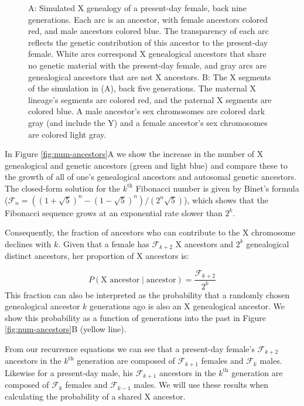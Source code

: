 \documentclass[9pt,twocolumn,twoside]{gsajnl}
\begin{document}
\begin{figure}[!ht]
    \caption{A: Simulated X genealogy of a present-day female, back nine
      generations.  Each arc is an ancestor, with female ancestors colored red,
      and male ancestors colored blue. The transparency of each arc reflects
      the genetic contribution of this ancestor to the present-day female.
      White arcs correspond X genealogical ancestors that share no genetic
      material with the present-day female, and gray arcs are genealogical
      ancestors that are not X ancestors. B: The X segments of the simulation
      in (A), back five generations.  The maternal X lineage's segments are
      colored red, and the paternal X segments are colored blue. A male
      ancestor's sex chromosomes are colored dark gray (and include the Y) and
    a female ancestor's sex chromosomes are colored light gray.}

    \label{fig:x-arc}

  \end{figure}

In Figure \ref{fig:num-ancestors}A we show the increase in the number of X
genealogical and genetic ancestors (green and light blue) and compare these to
the growth of all of one's genealogical ancestors and autosomal genetic
ancestors. The closed-form solution for the $k^\text{th}$ Fibonacci number is
given by Binet's formula ($\mathcal{F}_n = ((1 + \sqrt{5})^n - (1 -
\sqrt{5})^n)/(2^n \sqrt{5})$), which shows that the Fibonacci sequence grows at
an exponential rate slower than $2^k$. 

Consequently, the fraction of ancestors who can contribute to the X chromosome
declines with $k$. Given that a female has $\mathcal{F}_{k+2}$ X ancestors and
$2^k$ genealogical distinct ancestors, her proportion of X ancestors is:

\begin{equation}
  \label{eq:prob-x-anc}
  P(\text{X ancestor} \;|\; \text{ancestor}) = \frac{\mathcal{F}_{k+2}}{2^k} 
\end{equation}
%
This fraction can also be interpreted as the probability that a randomly chosen
genealogical ancestor $k$ generations ago is also an X genealogical ancestor.
We show this probability as a function of generations into the past in Figure
\ref{fig:num-ancestors}B (yellow line).

From our recurrence equations we can see that a present-day female's
$\mathcal{F}_{k+2}$ ancestors in the $k^\text{th}$ generation are composed of
$\mathcal{F}_{k+1}$ females and $\mathcal{F}_{k}$ males. Likewise for a
present-day male, his $\mathcal{F}_{k+1}$ ancestors in the $k^\text{th}$
generation are composed of $\mathcal{F}_{k}$ females and $\mathcal{F}_{k-1}$
males. We will use these results when calculating the probability of a shared X
ancestor.
\end{document}
